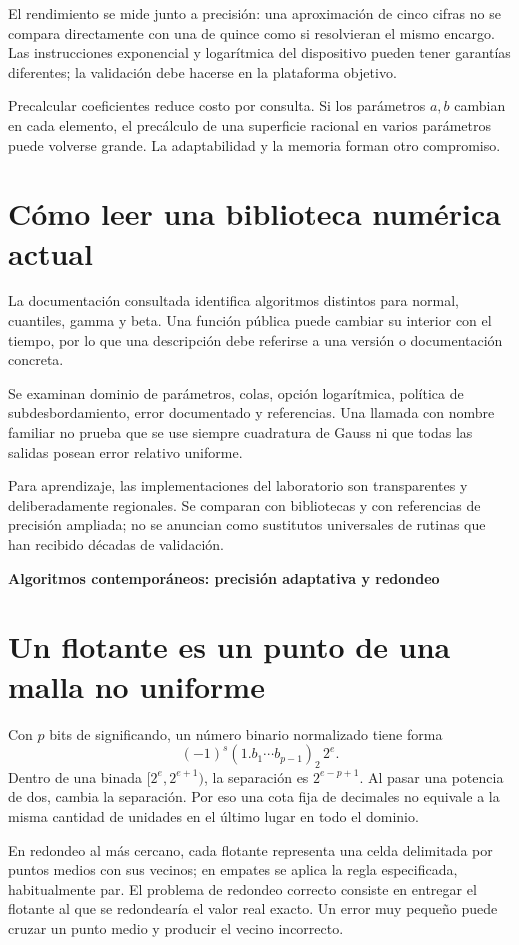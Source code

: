 \documentclass[11pt,a4paper]{article}
\theoremstyle{definition}
\newcommand{\parte}[1]{\par\bigskip\Needspace{8\baselineskip}\begin{center}{\Large\bfseries\color{azul}#1}\end{center}}
\newcounter{problema}
\begin{document}
El rendimiento se mide junto a precisión: una aproximación de cinco cifras no se compara directamente con una de quince como si resolvieran el mismo encargo. Las instrucciones exponencial y logarítmica del dispositivo pueden tener garantías diferentes; la validación debe hacerse en la plataforma objetivo.

Precalcular coeficientes reduce costo por consulta. Si los parámetros $a,b$ cambian en cada elemento, el precálculo de una superficie racional en varios parámetros puede volverse grande. La adaptabilidad y la memoria forman otro compromiso.

\section{Cómo leer una biblioteca numérica actual}
La documentación consultada identifica algoritmos distintos para normal, cuantiles, gamma y beta. Una función pública puede cambiar su interior con el tiempo, por lo que una descripción debe referirse a una versión o documentación concreta.

Se examinan dominio de parámetros, colas, opción logarítmica, política de subdesbordamiento, error documentado y referencias. Una llamada con nombre familiar no prueba que se use siempre cuadratura de Gauss ni que todas las salidas posean error relativo uniforme.

Para aprendizaje, las implementaciones del laboratorio son transparentes y deliberadamente regionales. Se comparan con bibliotecas y con referencias de precisión ampliada; no se anuncian como sustitutos universales de rutinas que han recibido décadas de validación.



\parte{Algoritmos contemporáneos: precisión adaptativa y redondeo}
\section{Un flotante es un punto de una malla no uniforme}
Con $p$ bits de significando, un número binario normalizado tiene forma
\[
(-1)^s(1.b_1\cdots b_{p-1})_2\,2^e.
\]
Dentro de una binada $[2^e,2^{e+1})$, la separación es $2^{e-p+1}$.
Al pasar una potencia de dos, cambia la separación.
Por eso una cota fija de decimales no equivale a la misma cantidad de unidades en el último lugar en todo el dominio.

En redondeo al más cercano, cada flotante representa una celda delimitada por puntos medios con sus vecinos; en empates se aplica la regla especificada, habitualmente par.
El problema de redondeo correcto consiste en entregar el flotante al que se redondearía el valor real exacto.
Un error muy pequeño puede cruzar un punto medio y producir el vecino incorrecto.
\end{document}
